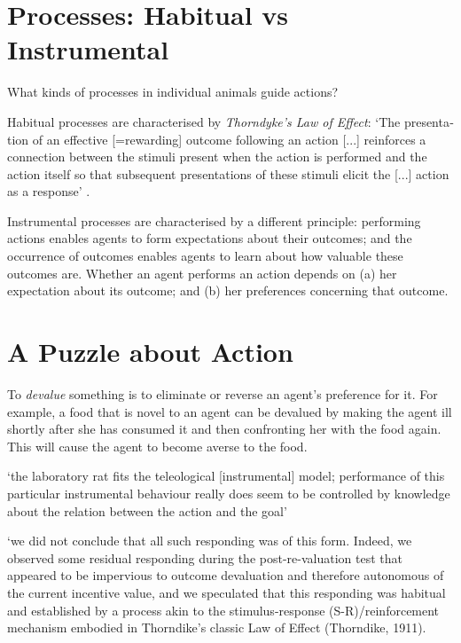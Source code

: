 \documentclass[12pt]{extarticle}
\begin{document}
\begin{multicols*}{3}
 
 
\section{Processes: Habitual vs Instrumental}
 
What kinds of processes in individual animals guide actions?
 
Habitual processes are characterised by \emph{Thorndyke’s Law of Effect}:
‘The presenta­tion of an effective [=rewarding] outcome following an action [...] rein­forces 
a connection between the stimuli present when the action is per­formed and the action itself  
so that subsequent presentations of these stimuli elicit the [...] action as a response’ 
\citep[p.48]{Dickinson:1994sm}.

Instrumental processes are characterised by a different principle: 
performing actions enables agents to form expectations about their outcomes;
and the occurrence of outcomes enables agents to learn about how valuable these outcomes are.
Whether an agent performs an action depends on (a) her expectation about its outcome; and (b) her preferences concerning that outcome. 

 
 
\section{A Puzzle about Action}
 
To \emph{devalue} something is to eliminate or reverse an agent’s preference for it.
For example, a food that is novel to an agent can be devalued by making the agent ill shortly after she has consumed it and then confronting her with the food again.
This will cause the agent to become averse to the food.

‘the laboratory rat fits the teleological [instrumental] model; performance of this particular instrumental behaviour really does seem to be controlled by knowledge about the relation between the action and the goal’
\citep[p.~72]{Dickinson:1985qp}
 
‘we did not conclude that all such responding was of this form.
Indeed, we observed some residual
responding during the post-re-valuation test that appeared to be impervious to outcome devaluation
and therefore autonomous of the current incentive value,
and we speculated that this responding was
habitual
and established by a process akin to the stimulus-response (S-R)/reinforcement mechanism
embodied in Thorndike’s classic Law of Effect (Thorndike, 1911).
\citep[p.~179]{dickinson:2016_instrumental}
 

\end{multicols*}
\end{document}
